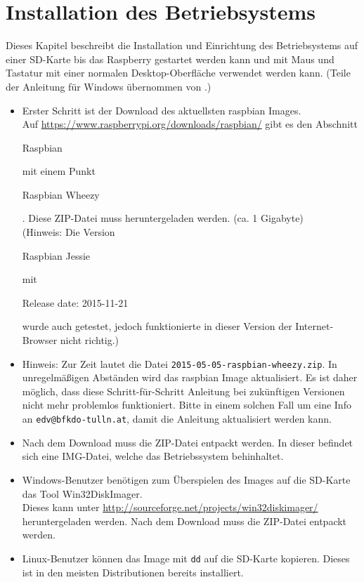 \label{sec:schritte}

\section{Installation des Betriebsystems}
\label{sec:stepsinstall}
Dieses Kapitel beschreibt die Installation und Einrichtung des Betriebsystems auf einer SD-Karte bis das Raspberry gestartet werden kann und mit Maus und Tastatur mit einer normalen Desktop-Oberfläche verwendet werden kann. (Teile der Anleitung für Windows übernommen von \cite{install}.)

\begin{itemize}
	\item {Erster Schritt ist der Download des aktuellsten raspbian Images.\\
		Auf \url{https://www.raspberrypi.org/downloads/raspbian/} gibt es den Abschnitt \begin{em}Raspbian\end{em} mit einem Punkt \begin{em}Raspbian Wheezy\end{em}. 
		Diese ZIP-Datei muss heruntergeladen werden.
		(ca. 1 Gigabyte)\\
		(Hinweis: Die Version \begin{em}Raspbian Jessie\end{em} mit \begin{em}Release date: 2015-11-21\end{em} wurde auch getestet, jedoch funktionierte in dieser Version der Internet-Browser nicht richtig.)
		}
	\item {Hinweis: Zur Zeit lautet die Datei \lstinline|2015-05-05-raspbian-wheezy.zip|.
		In unregelmäßigen Abständen wird das raspbian Image aktualisiert.
		Es ist daher möglich, dass diese Schritt-für-Schritt Anleitung bei zukünftigen Versionen nicht mehr problemlos funktioniert.
		Bitte in einem solchen Fall um eine Info an \verb|edv@bfkdo-tulln.at|, damit die Anleitung aktualisiert werden kann.}
	\item {Nach dem Download muss die ZIP-Datei entpackt werden. In dieser befindet sich eine IMG-Datei, welche das Betriebssystem behinhaltet.}
	\item {Windows-Benutzer benötigen zum Überspielen des Images auf die SD-Karte das Tool Win32DiskImager.\\
		Dieses kann unter \url{http://sourceforge.net/projects/win32diskimager/} heruntergeladen werden. 
		Nach dem Download muss die ZIP-Datei entpackt werden.
		}
	\item {Linux-Benutzer können das Image mit \lstinline|dd| auf die SD-Karte kopieren. Dieses ist in den meisten Distributionen bereits installiert.
}
\end{itemize}
